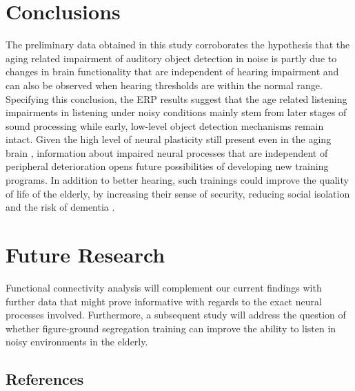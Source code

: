 \documentclass[a0,portrait]{a0poster}
\begin{document}
\begin{multicols}{2}

\section*{Conclusions}

The preliminary data obtained in this study corroborates the hypothesis that the aging related impairment of auditory object detection in noise is partly due to changes in brain functionality that are independent of hearing impairment and can also be observed when hearing thresholds are within the normal range. Specifying this conclusion, the ERP results suggest that the age related listening impairments in listening under noisy conditions mainly stem from later stages of sound processing while early, low-level object detection mechanisms remain intact. Given the high level of neural plasticity still present even in the aging brain \autocite{Grady2012}, information about impaired neural processes that are independent of peripheral deterioration opens future possibilities of developing new training programs. In addition to better hearing, such trainings could improve the quality of life of the elderly, by increasing their sense of security, reducing social isolation and the risk of dementia \autocite{Slade2020}.

\section*{Future Research}

Functional connectivity analysis will complement our current findings with further data that might prove informative with regards to the exact neural processes involved. Furthermore, a subsequent study will address the question of whether figure-ground segregation training can improve the ability to listen in noisy environments in the elderly.

\vspace{100pt}
\subsection*{References}
\AtNextBibliography{\tiny}
\printbibliography[heading=none]


\end{multicols}
\end{document}
